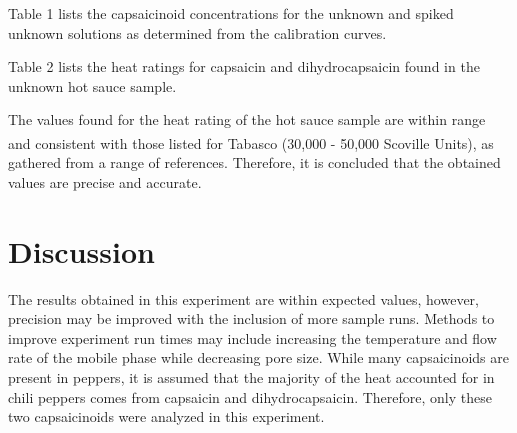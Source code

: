\documentclass{article}
\begin{document}
\begin{multicols}{2}
{Table 1 lists the capsaicinoid concentrations for the unknown and spiked
unknown solutions as determined from the calibration curves. 
\begin{center}
\end{center}

Table 2 lists the heat ratings for capsaicin and dihydrocapsaicin found in the
unknown hot sauce sample.
\begin{center}
\end{center}

The values found for the heat rating of the hot sauce sample are within range
and consistent with those listed for Tabasco\textsuperscript{\textregistered}
(30,000 - 50,000 Scoville Units), as gathered from a range of references.
Therefore, it is concluded that the obtained values are precise and accurate.

\section*{Discussion}
The results obtained in this experiment are within expected values, however,
precision may be improved with the inclusion of more sample runs. Methods to
improve experiment run times may include increasing the temperature and flow
rate of the mobile phase while decreasing pore size.
While many capsaicinoids are present in peppers, it is assumed that the majority
of the heat accounted for in chili peppers comes from capsaicin and
dihydrocapsaicin. Therefore, only these two capsaicinoids were analyzed in this
experiment.

}
\end{multicols}
\end{document}
